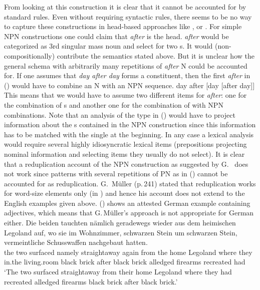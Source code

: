 \documentclass[output=paper]{langsci/langscibook}
\begin{document}

From looking at this construction it is clear that it cannot be accounted for by standard \xbar
rules. Even without requiring \xbar syntactic rules, there seems to be no way to capture these
constructions in head-based approaches like \minimalism, \cg or \dg. For simple NPN constructions
one could claim that \emph{after} is the head. \emph{after} would be categorized as 3rd singular
mass noun and select for two \nbar{}s. It would (non-compositionally) contribute the semantics stated above. But it is unclear how the general schema with arbitrarily
many repetitions of \emph{after} N could be accounted for. If one assumes that \emph{day after day}
forms a constituent, then the first \emph{after} in () would have to combine an N with an NPN sequence.
\ea
day after [day [after day]]
\z
This means that we would have to assume two different items for \emph{after}: one for the
combination of \nbar{}s and another one for the combination of \nbar with NPN combinations. Note
that an analysis of the type in () would have to project information about the \nbar{}s contained
in the NPN construction since this information has to be matched with the single \nbar at the
beginning. In any case a lexical analysis would require several highly idiosyncratic lexical items
(prepositions projecting nominal information and selecting items they usually do not select).
It is clear that a reduplication account of the NPN construction as suggested by
G.\ \citet{GMueller2011a} does not work since patterns with several repetitions of PN as in
() cannot be accounted for as reduplication. G.\ Müller (p.\,241) stated that reduplication works
for word-size elements only (in ) and hence his account does not extend to the English
examples given above. () shows an attested German example containing adjectives, which means
that G.\,Müller's approach is not appropriate for German either.
\ea
\label{ex-schwarzen-stein}
\gll Die beiden tauchten nämlich geradewegs wieder aus dem heimischen Legoland auf, wo sie im
Wohnzimmer, schwarzen Stein um schwarzen Stein, vermeintliche Schusswaffen nachgebaut
hatten.\footnotemark\\
     the two    surfaced namely straightaway again   from the home Legoland \particle{} where they
     in.the living.room black brick after black brick alledged firearms recreated had\\%
{}
\glt `The two surfaced straightaway from their home Legoland where they had recreated alledged
firearms black brick after black brick.'
\z
\end{document}
